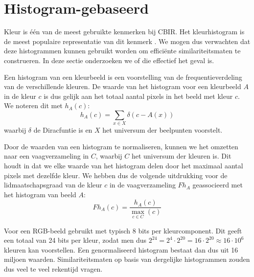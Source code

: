 \section{Histogram-gebaseerd}

Kleur is \'e\'en van de meest gebruikte kenmerken bij CBIR. Het kleurhistogram is de meest 
populaire representatie van dit kenmerk \cite{rui:image_retr}. We mogen dus verwachten
dat deze histogrammen kunnen gebruikt worden om effici\"ente similariteitsmaten te construeren.
In deze sectie onderzoeken we of die effectief het geval is. 

Een histogram van een kleurbeeld is een voorstelling van de frequentieverdeling van de
verschillende kleuren. De waarde van het histogram voor een kleurbeeld $A$ in de kleur $c$ is
dus gelijk aan het totaal aantal pixels in het beeld met kleur $c$. We noteren dit met $h_A(c)$:
$$
h_A(c) = \sum_{x \in X} \delta (c - A(x))
$$
waarbij $\delta$ de Diracfuntie is en $X$ het universum der beelpunten voorstelt. 

Door de waarden van een histogram te normaliseren, kunnen we het omzetten naar een 
vaagverzameling in $C$, waarbij $C$ het universum der kleuren is. Dit houdt in dat we elke
waarde van het histogram delen door het maximaal aantal pixels met dezelfde kleur. 
We hebben dus de volgende uitdrukking voor de lidmaatschapsgraad van de kleur $c$ in de 
vaagverzameling $Fh_A$ geassocieerd met het histogram van beeld $A$:
$$
Fh_A(c) = \frac{\displaystyle h_A(c)}{\displaystyle \max_{c \in C}(c)}
$$

Voor een RGB-beeld gebruikt met typisch 8 bits per kleurcomponent. Dit geeft een totaal van
24 bits per kleur, zodat men dus $2^{24}=2^4 \cdot 2^{20}=16 \cdot 2^{20} \approx 16 \cdot 10^6$
kleuren kan voorstellen. Een genormaliseerd histogram bestaat dan dus uit 16 miljoen waarden.
Similariteitsmaten op basis van dergelijke histogrammen zouden dus veel te veel rekentijd vragen.

